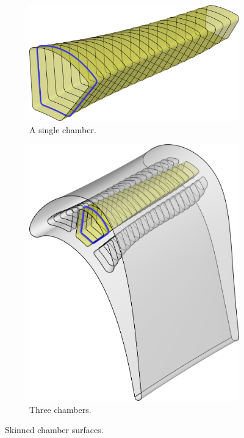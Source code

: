 \documentclass[a4paper, 11pt]{report}
\theoremstyle{definition}
\begin{document}
	\begin{figure}[H]
		\centering
		\begin{subfigure}{.65\textwidth}
			\includegraphics[width=\textwidth]{../tec/lifting/lifted.png}
			\caption{A single chamber.}
		\end{subfigure}
		\phantom{aa}
		\begin{subfigure}{.3\textwidth}
			\includegraphics[width=\textwidth]{../tec/lifting/complete.png}
			\caption{Three chambers.}
		\end{subfigure}
		\caption{Skinned chamber surfaces.}
		\label{fig:skinned_chambers}
	\end{figure}
	
\end{document}
